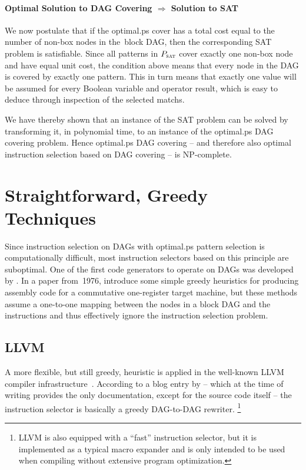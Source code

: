 \paragraph{Optimal Solution to DAG Covering $\Rightarrow$ Solution to SAT}

We now postulate that if the \gls{optimal.ps} cover has a total cost equal to
the number of non-\glspl{box node} in the~\gls{block DAG}, then the
corresponding \gls{SAT} problem is satisfiable.
%
Since all \glspl{pattern} in $P_{\textrm{\textsc{sat}}}$ cover exactly one non-\gls{box node} and
have equal unit cost, the condition above means that every \gls{node} in the
\gls{DAG} is covered by exactly one \gls{pattern}.
%
This in turn means that exactly one value will be assumed for every Boolean
\gls{variable} and operator result, which is easy to deduce through inspection
of the selected \glspl{match}.

We have thereby shown that an instance of the \gls{SAT} problem can be solved by
transforming it, in polynomial time, to an instance of the \gls{optimal.ps}
\gls{DAG covering} problem.
%
Hence \gls{optimal.ps} \gls{DAG covering} -- and therefore also optimal
\gls{instruction selection} based on \gls{DAG covering} -- is NP-complete.
%
\hfill\qedsymbol


\section{Straightforward, Greedy Techniques}

Since \gls{instruction selection} on \glspl{DAG} with \gls{optimal.ps}
\gls{pattern selection} is computationally difficult, most \glspl{instruction
  selector} based on this \gls{principle} are suboptimal.
%
One of the first \glspl{code generator} to operate on \glspl{DAG} was developed
by \textcite{AhoEtAl:1976}.
%
In a paper from~1976, \citeauthor{AhoEtAl:1976} introduce some simple greedy
heuristics for producing \gls{assembly code} for a commutative
one-\gls{register} \gls{target machine}, but these methods assume a one-to-one
mapping between the \glspl{node} in a \gls{block DAG} and the
\glspl{instruction} and thus effectively ignore the \gls{instruction selection}
problem.


\subsection{LLVM}

A more flexible, but still greedy, heuristic is applied in the well-known
\gls{LLVM} \gls{compiler} infrastructure~\cite{LattnerAdve:2004}.
%
According to a blog entry by \textcite{Bendersky:2013} -- which at the time of
writing provides the only documentation, except for the source code itself --
the \gls{instruction selector} is basically a greedy
\mbox{\gls{DAG}-to-\gls{DAG}} rewriter.\!%
%
\footnote{%
  \gls{LLVM} is also equipped with a ``fast'' \gls{instruction selector}, but it
  is implemented as a typical \gls{macro expander} and is only intended to be
  used when compiling without extensive \gls{program} optimization.%
}

